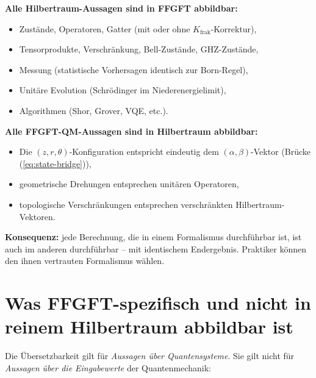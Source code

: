 \textbf{Alle Hilbertraum-Aussagen sind in FFGFT abbildbar:}
\begin{itemize}[leftmargin=2em,itemsep=2pt,topsep=2pt]
  \item Zustände, Operatoren, Gatter (mit oder ohne $K_{\text{frak}}$-Korrektur),
  \item Tensorprodukte, Verschränkung, Bell-Zustände, GHZ-Zustände,
  \item Messung (statistische Vorhersagen identisch zur Born-Regel),
  \item Unitäre Evolution (Schrödinger im Niederenergielimit),
  \item Algorithmen (Shor, Grover, VQE, etc.).
\end{itemize}

\textbf{Alle FFGFT-QM-Aussagen sind in Hilbertraum abbildbar:}
\begin{itemize}[leftmargin=2em,itemsep=2pt,topsep=2pt]
  \item Die $(z, r, \theta)$-Konfiguration entspricht eindeutig dem
        $(\alpha, \beta)$-Vektor (Brücke (\ref{eq:state-bridge})),
  \item geometrische Drehungen entsprechen unitären Operatoren,
  \item topologische Verschränkungen entsprechen verschränkten
        Hilbertraum-Vektoren.
\end{itemize}

\textbf{Konsequenz:} jede Berechnung, die in einem Formalismus
durchführbar ist, ist auch im anderen durchführbar -- mit identischem
Endergebnis. Praktiker können den ihnen vertrauten Formalismus
wählen.

\section{Was FFGFT-spezifisch und nicht in reinem Hilbertraum abbildbar ist}

Die Übersetzbarkeit gilt für \emph{Aussagen über Quantensysteme}.
Sie gilt nicht für \emph{Aussagen über die Eingabewerte} der
Quantenmechanik:

